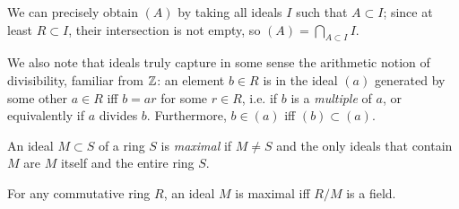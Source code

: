We can precisely obtain $(A)$ by taking all ideals $I$ such that $A\subset I$; since at least $R\subset I$, their intersection is not empty, so $(A)=\bigcap_{A\subset I} I$.

We also note that ideals truly capture in some sense the arithmetic notion of divisibility, familiar from $\mathbb{Z}$: an element $b\in R$ is in the ideal $(a)$ generated by some other $a\in R$ iff $b=ar$ for some $r\in R$, i.e. if $b$ is a \emph{multiple} of $a$, or equivalently if $a$ divides $b$. Furthermore, $b\in(a)$ iff $(b)\subset(a)$.

\begin{definition}
	An ideal $M\subset S$ of a ring $S$ is \emph{maximal} if $M\neq S$ and the only ideals that contain $M$ are $M$ itself and the entire ring $S$.
\end{definition}

\begin{proposition}
	For any commutative ring $R$, an ideal $M$ is maximal iff $R/M$ is a field.
\end{proposition}












